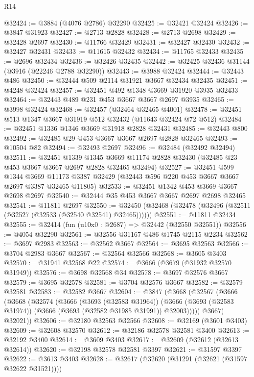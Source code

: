 \begin{lexlean}{R14}
\begin{coremodule}
@32424 := @3884 (@4076 @2786) @32290
@32425 := @32421 @32424
@32426 := @3847 @31923
@32427 := @2713 @2828
@32428 := @2713 @2698
@32429 := @32428 @2697
@32430 := @11766 @32429
@32431 := @32427 @32430
@32432 := @32427 @32431
@32433 := @11615 @32432
@32434 := @11765 @32433
@32435 := @2696 @32434
@32436 := @32426 @32435
@32442 := @32425 @32436 @31144 (@3916 (@22246 @2788 @32290))
@32443 := @3988 @32424
@32444 := @32443 @486
@32450 := @32444 @509 @2114 @31921 @3667 @32434 @32435
@32451 := @4248 @32424
@32457 := @32451 @492 @1348 @3669 @31920 @3935 @32433
@32464 := @32443 @489 @231 @453 @3667 @3667 @2697 @3935
@32465 := @3998 @32424
@32468 := @32457 (@32464 @32465 @4001)
@32478 := @32451 @513 @1347 @3667 @31919 @512 @32432 (@11643 @32424 @72 @512)
@32484 := @32451 @1336 @1346 @3669 @31918 @2828 @32431
@32485 := @32443 @800
@32492 := @32485 @29 @453 @3667 @3667 @2697 @2828 @32465
@32493 := @10504 @82
@32494 := @32493 @2697
@32496 := @32484 (@32492 @32494)
@32511 := @32451
    @1339
    @1345
    @3669
    @11174
    @2828
    @32430
    (@32485 @23 @453 @3667 @3667 @2697 @2828 @32465 @32494)
@32527 := @32451
    @599
    @1344
    @3669
    @11173
    @3387
    @32429
    (@32443 @596 @220 @453 @3667 @3667 @2697 @3387 @32465 @11805)
@32533 := @32451 @1342 @453 @3669 @3667 @2698 @2697
@32540 := @32444 @35 @453 @3667 @3667 @2697 @2698 @32465
@32541 := @11811 @2697
@32550 := @32450 (@32468 (@32478 (@32496 (@32511 (@32527 (@32533 (@32540 @32541) @32465))))))
@32551 := @11811 @32434
@32555 := @32414 (fun (u10x0 : @2687) => @32442 (@32550 @32551))
@32556 := @4054 @32290
@32561 := @32556 @31167 @486 @1745 @2115 @2234
@32562 := @3697 @2983
@32563 := @32562 @3667
@32564 := @3695 @32563
@32566 := @3704 @2983 @3667
@32567 := @32564 @32566
@32568 := @3605 @3403
@32570 := @31941 @32568 @22
@32574 := @3666 (@3679 (@31932 @32570 @31949))
@32576 := @3698 @32568 @34
@32578 := @3697 @32576 @3667
@32579 := @3695 @32578
@32581 := @3704 @32576 @3667
@32582 := @32579 @32581
@32583 := @32582 @3667
@32604 := @3847
    (@3668
      (@32567
        (@3666
          (@3668
            (@32574
              (@3666
                (@3693 (@32583 @31964))
                (@3666 (@3693 (@32583 @31974)) (@3666 (@3693 (@32582 @31985 @31991)) @32003)))))
          @3667)
        @32021))
@32606 := @32180 @32563 @32566
@32608 := @32169 (@3601 @3403)
@32609 := @32608 @32570
@32612 := @32186 @32578 @32581 @3400
@32613 := @32192 @3400
@32614 := @3609 @3403
@32617 := @32609 (@32612 (@32613 @32614))
@32620 := @32198 @32578 @32581 @3397
@32621 := @31597 @3397
@32622 := @3613 @3403
@32628 := @32617 (@32620 (@31291 (@32621 (@31597 @32622 @31521))))

\end{coremodule}
\end{lexlean}
